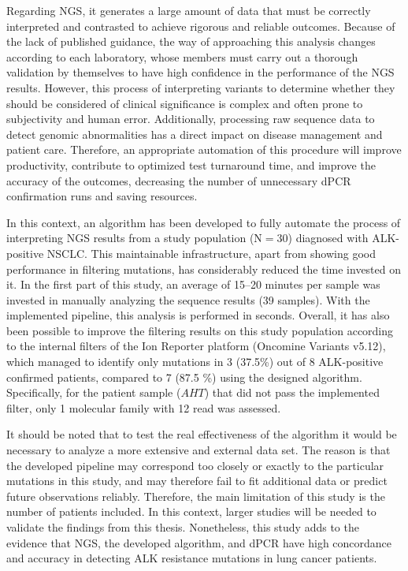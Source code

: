 Regarding NGS, it generates a large amount of data that must be correctly interpreted and contrasted to achieve rigorous and reliable outcomes. Because of the lack of published guidance, the way of approaching this analysis changes according to each laboratory, whose members must carry out a thorough validation by themselves to have high confidence in the performance of the NGS results. However, this process of interpreting variants to determine whether they should be considered of clinical significance is complex and often prone to subjectivity and human error. Additionally, processing raw sequence data to detect genomic abnormalities has a direct impact on disease management and patient care. 
Therefore, an appropriate automation of this procedure will improve productivity, contribute to optimized test turnaround time, and improve the accuracy of the outcomes, decreasing the number of unnecessary dPCR confirmation runs and saving resources.

In this context, an algorithm has been developed to fully automate the process of interpreting NGS results from a study population (N$=$30) diagnosed with ALK-positive NSCLC. This maintainable infrastructure, apart from showing good performance in filtering mutations, has considerably reduced the time invested on it. In the first part of this study, an average of 15–20 minutes per sample was invested in manually analyzing the sequence results (39 samples). With the implemented pipeline, this analysis is performed in seconds. Overall, it has also been possible to improve the filtering results on this study population according to the internal filters of the Ion Reporter\texttrademark{} platform (Oncomine\texttrademark{} Variants v5.12), which managed to identify only mutations in 3 (37.5\%) out of 8 ALK-positive confirmed patients, compared to 7 (87.5 \%) using the designed algorithm. Specifically, for the patient sample ($AHT$) that did not pass the implemented filter, only 1 molecular family with 12 read was assessed.

It should be noted that to test the real effectiveness of the algorithm it would be necessary to analyze a more extensive and external data set. The reason is that the developed pipeline may correspond too closely or exactly to the particular mutations in this study, and may therefore fail to fit additional data or predict future observations reliably. Therefore, the main limitation of this study is the number of patients included. In this context, larger studies will be needed to validate the findings from this thesis. Nonetheless, this study adds to the evidence that NGS, the developed algorithm, and dPCR have high concordance and accuracy in detecting ALK resistance mutations in lung cancer patients.


